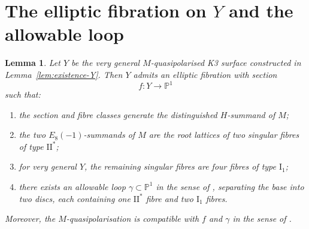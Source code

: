 \documentclass[11pt]{amsart}
\newtheorem{lemma}{Lemma}
\theoremstyle{definition}
\newcommand{\bP}{\mathbb P}
\begin{document}
\section{The elliptic fibration on $Y$ and the allowable loop}

\begin{lemma}\label{lem:fibration-Y}
Let $Y$ be the very general $M$-quasipolarised K3 surface constructed in Lemma~\ref{lem:existence-Y}. Then $Y$ admits an elliptic fibration with section
\[
f\colon Y\longrightarrow \bP^1
\]
such that:
\begin{enumerate}
\item the section and fibre classes generate the distinguished $H$-summand of $M$;
\item the two $E_8(-1)$-summands of $M$ are the root lattices of two singular fibres of type $\mathrm{II}^*$;
\item for very general $Y$, the remaining singular fibres are four fibres of type $\mathrm{I}_1$;
\item there exists an allowable loop $\gamma\subset \bP^1$ in the sense of \cite[Definition~4.11]{GT24}, separating the base into two discs, each containing one $\mathrm{II}^*$ fibre and two $\mathrm{I}_1$ fibres.
\end{enumerate}
Moreover, the $M$-quasipolarisation is compatible with $f$ and $\gamma$ in the sense of \cite[Definition~4.21]{GT24}.
\end{lemma}
\end{document}
